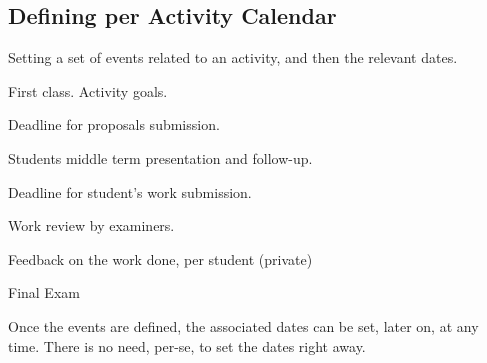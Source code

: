 \documentclass[10pt]{article}
\begin{document}

\subsection{Defining per Activity Calendar}
Setting a set of events related to an activity, and then the relevant dates.


\begin{codestore}

    {First class. Activity goals.}

    {Deadline for proposals submission.}

    {Students middle term presentation and follow-up.  }

    {Deadline for student's work submission.}

    {Work review by examiners.}

    {Feedback on the work done, per student (private)}

    {Final Exam}
\end{codestore}

\begin{codestore}

\end{codestore}



Once the events are defined, the associated dates can be set, later on, at any time. There is no need, per-se, to set the dates right away.

\end{document}
